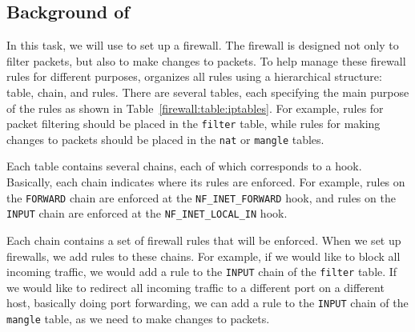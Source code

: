 \subsection{Background of \iptables}

In this task, we will use \iptables to set up a firewall. 
The \iptables firewall is designed not only to filter packets, but also to make changes to
packets. To help manage these firewall rules for different purposes, \iptables organizes all
rules using a hierarchical structure: table, chain, and rules.
There are several tables, each specifying the main purpose of the rules as shown
in Table~\ref{firewall:table:iptables}.
For example, rules for packet filtering should be
placed in the \texttt{filter} table, while rules for making changes to packets should be placed
in the \texttt{nat} or \texttt{mangle} tables.

Each table contains several chains, each of which corresponds to a \netfilter hook. Basically,
each chain indicates where its rules are enforced. For example, rules on
the \texttt{FORWARD} chain are enforced at the \texttt{NF\_INET\_FORWARD} hook, and rules on
the \texttt{INPUT} chain are enforced at the  \texttt{NF\_INET\_LOCAL\_IN} hook.

Each chain contains a set of firewall rules that will be enforced.
When we set up firewalls, we add rules to these chains.
For example, if we would like to block all incoming \telnet traffic, we would
add a rule to the \texttt{INPUT} chain of the \texttt{filter} table.  If we
would like to redirect all incoming \telnet traffic to a different
port on a different host, basically doing port forwarding, we can add a rule to the
\texttt{INPUT} chain of the \texttt{mangle} table, as we need to make changes to packets.


